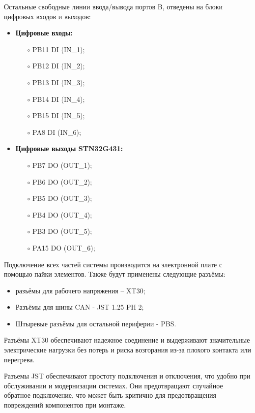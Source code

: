 Остальные свободные линии ввода/вывода портов B, отведены на блоки цифровых входов и выходов:
\begin{itemize}
	\item \textbf{Цифровые входы:}
	      \begin{itemize}
		      \item[$\circ$] PB11 \leftarrow DI (IN\_1);
		      \item[$\circ$] PB12 \leftarrow DI (IN\_2);
		      \item[$\circ$] PB13 \leftarrow DI (IN\_3);
		      \item[$\circ$] PB14 \leftarrow DI (IN\_4);
		      \item[$\circ$] PB15 \leftarrow DI (IN\_5);
		      \item[$\circ$] PA8 \leftarrow DI (IN\_6);
	      \end{itemize}
	\item \textbf{Цифровые выходы STN32G431:}
	      \begin{itemize}
		      \item[$\circ$] PB7 \rightarrow DO (OUT\_1);
		      \item[$\circ$] PB6 \rightarrow DO (OUT\_2);
		      \item[$\circ$] PB5 \rightarrow DO (OUT\_3);
		      \item[$\circ$] PB4 \rightarrow DO (OUT\_4);
		      \item[$\circ$] PB3 \rightarrow DO (OUT\_5);
		      \item[$\circ$] PA15 \rightarrow DO (OUT\_6);
	      \end{itemize}
\end{itemize}

Подключение всех частей системы производится на электронной плате с помощью пайки элементов. Также будут применены следующие разъёмы:
\begin{itemize}
	\item разъёмы для рабочего напряжения – XT30;
	\item Разъёмы для шины CAN - JST 1.25 PH 2;
	\item Штыревые разъёмы для остальной периферии - PBS.
\end{itemize}

Разъёмы XT30 обеспечивают надежное соединение и выдерживают значительные электрические нагрузки без потерь и риска возгорания из-за плохого контакта или перегрева.

Разъемы JST обеспечивают простоту подключения и отключения, что удобно при обслуживании и модернизации системах. Они предотвращают случайное обратное подключение, что может быть критично для предотвращения повреждений компонентов при монтаже.

